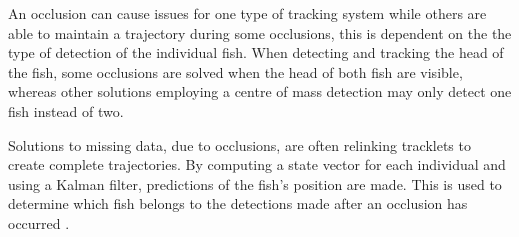 An occlusion can cause issues for one type of tracking system while others are able to maintain a trajectory during some occlusions, this is dependent on the the type of detection of the individual fish. When detecting and tracking the head of the fish, some occlusions are solved when the head of both fish are visible, whereas other solutions employing a centre of mass detection may only detect one fish instead of two.

Solutions to missing data, due to occlusions, are often relinking tracklets to create complete trajectories. By computing a state vector for each individual and using a Kalman filter, predictions of the fish’s position are made. This is used to determine which fish belongs to the detections made after an occlusion has occurred \citep{Feijo2018, Qian2014}. 


%
%
%
%
